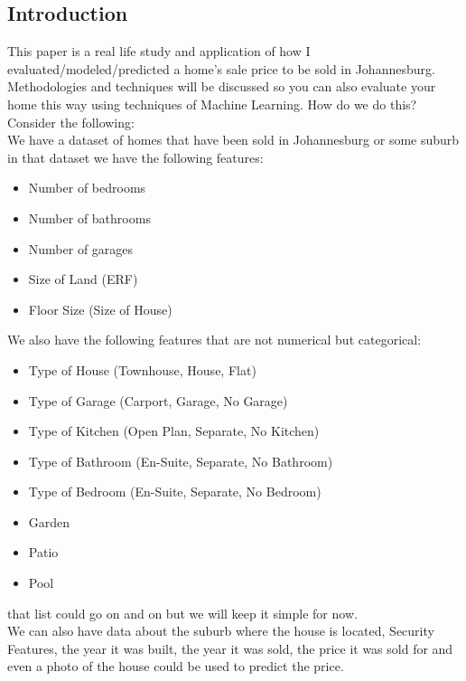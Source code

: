 \subsection{Introduction}
This paper is a real life study and application of how I evaluated/modeled/predicted a home's sale price to be sold in Johannesburg. Methodologies and techniques will be discussed so you can also evaluate your home this way using techniques of Machine Learning. How do we do this? \\

Consider the following: \\

We have a dataset of homes that have been sold in Johannesburg or some suburb in that dataset we have the following features:
\begin{itemize}
    \item Number of bedrooms
    \item Number of bathrooms
    \item Number of garages
    \item Size of Land (ERF)
    \item Floor Size (Size of House)   
\end{itemize}

We also have the following features that are not numerical but categorical:
\begin{itemize}
    \item Type of House (Townhouse, House, Flat)
    \item Type of Garage (Carport, Garage, No Garage)
    \item Type of Kitchen (Open Plan, Separate, No Kitchen)
    \item Type of Bathroom (En-Suite, Separate, No Bathroom)
    \item Type of Bedroom (En-Suite, Separate, No Bedroom)
    \item Garden
    \item Patio
    \item Pool
\end{itemize}

that list could go on and on but we will keep it simple for now. \\

We can also have data about the suburb where the house is located, Security Features, the year it was built, the year it was sold, the price it was sold for and even a photo of the house could be used to predict the price. \\

